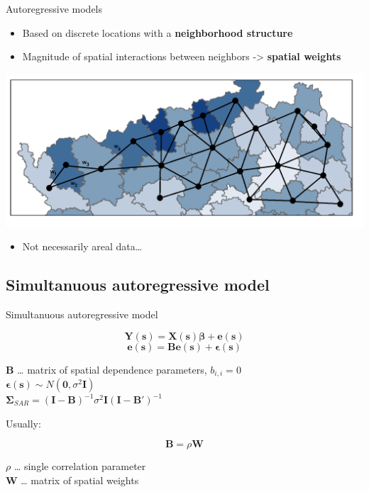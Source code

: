 \documentclass[
  ignorenonframetext,
]{beamer}
\providecommand{\tightlist}{%
  \setlength{\itemsep}{0pt}\setlength{\parskip}{0pt}}
\begin{document}
\begin{frame}{Autoregressive models}
\small

\begin{itemize}
\tightlist
\item
  Based on discrete locations with a \textbf{neighborhood structure}
\item
  Magnitude of spatial interactions between neighbors -\textgreater{}
  \textbf{spatial weights}
\end{itemize}

\includegraphics{areal_data.png}

\begin{itemize}
\tightlist
\item
  Not necessarily areal data\ldots{}
\end{itemize}
\end{frame}

\hypertarget{simultanuous-autoregressive-model}{%
\subsection{Simultanuous autoregressive
model}\label{simultanuous-autoregressive-model}}

\begin{frame}{Simultanuous autoregressive model}
\small

\[\boldsymbol{Y}(\boldsymbol{s}) = \boldsymbol{X}(\boldsymbol{s})\boldsymbol{\beta} + \boldsymbol{e}(\boldsymbol{s})\]
\[\boldsymbol{e}(\boldsymbol{s}) = \boldsymbol{B}\boldsymbol{e}(\boldsymbol{s})+\boldsymbol{\epsilon}(\boldsymbol{s})\]

\(\boldsymbol{B}\) \ldots{} matrix of spatial dependence parameters,
\(b_{i,i}=0\)\\
\(\boldsymbol{\epsilon}(\boldsymbol{s})\sim N(\boldsymbol{0}, \sigma^2\boldsymbol{I})\)\\
\(\boldsymbol{\Sigma}_{SAR}=(\boldsymbol{I}-\boldsymbol{B})^{-1}\sigma^2\boldsymbol{I}(\boldsymbol{I}-\boldsymbol{B}')^{-1}\)

Usually:

\[\boldsymbol{B} = \rho\boldsymbol{W}\]

\(\rho\) \ldots{} single correlation parameter\\
\(\boldsymbol{W}\) \ldots{} matrix of spatial weights
\end{frame}
\end{document}
